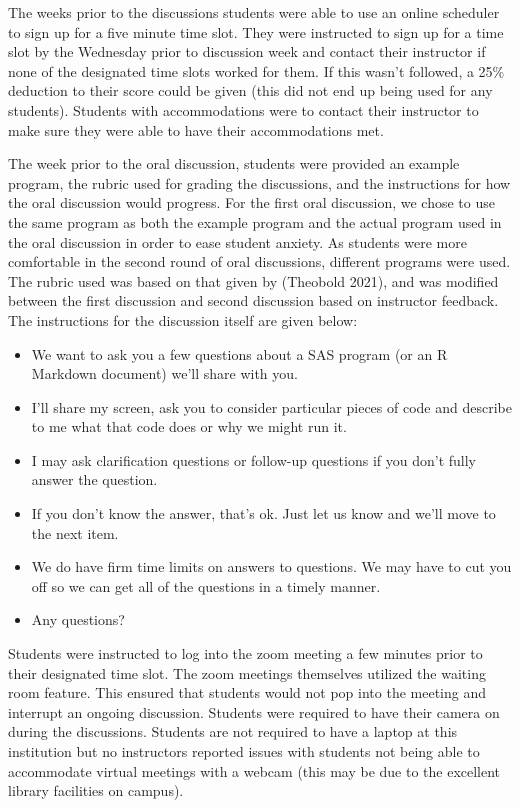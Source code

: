 \documentclass[
  letterpaper,
  DIV=11,
  numbers=noendperiod]{scrartcl}
\providecommand{\tightlist}{%
  \setlength{\itemsep}{0pt}\setlength{\parskip}{0pt}}\usepackage{longtable,booktabs,array}
\begin{document}
The weeks prior to the discussions students were able to use an online
scheduler to sign up for a five minute time slot. They were instructed
to sign up for a time slot by the Wednesday prior to discussion week and
contact their instructor if none of the designated time slots worked for
them. If this wasn't followed, a 25\% deduction to their score could be
given (this did not end up being used for any students). Students with
accommodations were to contact their instructor to make sure they were
able to have their accommodations met.

The week prior to the oral discussion, students were provided an example
program, the rubric used for grading the discussions, and the
instructions for how the oral discussion would progress. For the first
oral discussion, we chose to use the same program as both the example
program and the actual program used in the oral discussion in order to
ease student anxiety. As students were more comfortable in the second
round of oral discussions, different programs were used. The rubric used
was based on that given by (Theobold 2021), and was modified between the
first discussion and second discussion based on instructor feedback. The
instructions for the discussion itself are given below:

\begin{itemize}
\tightlist
\item
  We want to ask you a few questions about a SAS program (or an R
  Markdown document) we'll share with you.
\item
  I'll share my screen, ask you to consider particular pieces of code
  and describe to me what that code does or why we might run it.
\item
  I may ask clarification questions or follow-up questions if you don't
  fully answer the question.
\item
  If you don't know the answer, that's ok. Just let us know and we'll
  move to the next item.
\item
  We do have firm time limits on answers to questions. We may have to
  cut you off so we can get all of the questions in a timely manner.
\item
  Any questions?
\end{itemize}

Students were instructed to log into the zoom meeting a few minutes
prior to their designated time slot. The zoom meetings themselves
utilized the waiting room feature. This ensured that students would not
pop into the meeting and interrupt an ongoing discussion. Students were
required to have their camera on during the discussions. Students are
not required to have a laptop at this institution but no instructors
reported issues with students not being able to accommodate virtual
meetings with a webcam (this may be due to the excellent library
facilities on campus).
\end{document}
